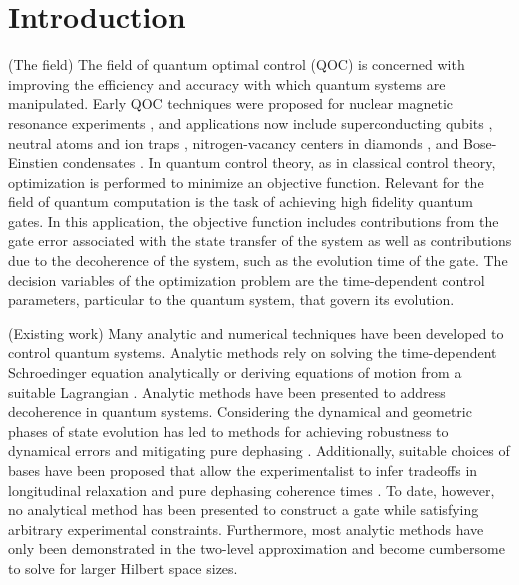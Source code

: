 \documentclass[
  amsfonts,
  amsmath,
  tbtags,
  amssymb,
  aps,
  nobibnotes,
  twocolumn,
]{revtex4-2}
\begin{document}
\section{Introduction}
(The field) The field of quantum optimal control (QOC) is concerned
with improving the efficiency and accuracy with which quantum systems
are manipulated.
Early QOC techniques were proposed for nuclear magnetic resonance experiments
\cite{khaneja2005optimal}, and applications now include superconducting
qubits \cite{heeres2017implementing,
  leng2019robust, leung2017speedup, xu2020nonadiabatic},
neutral atoms and ion traps \cite{van2016optimal}, nitrogen-vacancy centers in
diamonds \cite{rembold2020introduction}, and Bose-Einstien condensates
\cite{sorensen2018quantum}.
In quantum control theory, as in classical control theory,
optimization is performed
to minimize an objective function. Relevant for the field
of quantum computation is the task of achieving high fidelity quantum gates.
In this application, the objective function includes contributions from the
gate error associated with the state transfer of the system as well as contributions
due to the decoherence of the system, such as the evolution time of the gate.
The decision variables of the optimization problem are the time-dependent control
parameters, particular to the quantum system, that govern its evolution.

(Existing work) Many analytic and numerical techniques have been developed to control
quantum systems. Analytic methods rely on solving the time-dependent
Schroedinger equation analytically or deriving equations of motion
from a suitable Lagrangian \cite{zhang2020universal, huang2020engineering, han2020experimental,
  xu2020nonadiabatic, carlini2005quantum}. Analytic methods
have been presented to address decoherence in quantum systems.
Considering the dynamical and geometric phases of state
evolution has led to methods for achieving
robustness to dynamical errors and mitigating pure dephasing
\cite{xu2020nonadiabatic, han2020experimental, merrill2014progress}.
Additionally, suitable choices of bases have been proposed that
allow the experimentalist to infer tradeoffs in longitudinal relaxation
and pure dephasing coherence times \cite{huang2020engineering}.
To date, however, no analytical method has been presented
to construct a gate while satisfying arbitrary experimental
constraints. Furthermore, most analytic methods have only
been demonstrated in the two-level approximation and become
cumbersome to solve for larger Hilbert space sizes.
\end{document}
